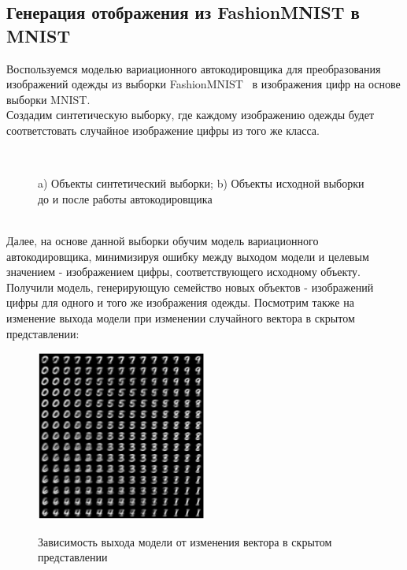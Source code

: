 \subsection{Генерация отображения из FashionMNIST в MNIST}
Воспользуемся моделью вариационного автокодировщика для преобразования изображений одежды из выборки FashionMNIST~\cite{FMNIST} в изображения цифр на основе выборки MNIST.\\
Создадим синтетическую выборку, где каждому изображению одежды будет соответстовать случайное изображение цифры из того же класса.\\
\begin{figure}[h!t]\center
{}
\\
\caption{a) Объекты синтетический выборки; b) Объекты исходной выборки до и после работы автокодировщика}
\end{figure}\\
Далее, на основе данной выборки обучим модель вариационного автокодировщика, минимизируя ошибку между выходом модели и целевым значением - изображением цифры, соответствующего исходному объекту.\\
Получили модель, генерирующую семейство новых объектов - изображений цифры для одного и того же изображения одежды.
\newpage
Посмотрим также на изменение выхода модели при изменении случайного вектора в скрытом представлении:\\
\begin{figure}[h!t]\center
{\includegraphics[width=0.5\textwidth]{results/10x10.png}}
\caption{Зависимость выхода модели от изменения вектора в скрытом представлении}
\end{figure}\\

